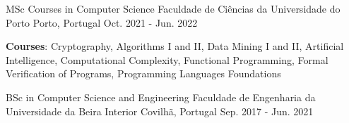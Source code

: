 


\begin{cventries}

\cventry
  {MSc Courses in Computer Science} %
  {Faculdade de Ciências da Universidade do Porto} %
  {Porto, Portugal} %
  {Oct. 2021 - Jun. 2022} %
  {
    \begin{cvitems} %
    \item \textbf{Courses}:
      Cryptography,
      Algorithms I and II,
      Data Mining I and II,
      Artificial Intelligence,
      Computational Complexity,
      Functional Programming,
      Formal Verification of Programs,
      Programming Languages Foundations
    \end{cvitems}
  }
  {}

\cventry
  {BSc in Computer Science and Engineering} %
  {Faculdade de Engenharia da Universidade da Beira Interior} %
  {Covilhã, Portugal} %
  {Sep. 2017 - Jun. 2021} %
  {}
  {}

\end{cventries}
